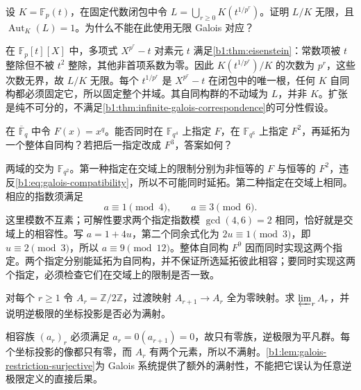 \begin{exercise}\label{b1:ex:22-2}
	设 \(K=\mathbb F_p(t)\)，在固定代数闭包中令 \(L=\bigcup_{r\geq0}K(t^{1/p^r})\)。证明 \(L/K\) 无限，且 \(\operatorname{Aut}_K(L)=1\)。为什么不能在此使用无限 Galois 对应？
\end{exercise}
\begin{solution}
	在 \(\mathbb F_p[t][X]\) 中，多项式 \(X^{p^r}-t\) 对素元 \(t\) 满足\cref{b1:thm:eisenstein}：常数项被 \(t\) 整除但不被 \(t^2\) 整除，其他非首项系数为零。因此 \(K(t^{1/p^r})/K\) 的次数为 \(p^r\)，这些次数无界，故 \(L/K\) 无限。每个 \(t^{1/p^r}\) 是 \(X^{p^r}-t\) 在闭包中的唯一根，任何 \(K\) 自同构都必须固定它，所以固定整个并域。其自同构群的不动域为 \(L\)，并非 \(K\)。扩张是纯不可分的，不满足\cref{b1:thm:infinite-galois-correspondence}的可分性假设。
\end{solution}

\begin{exercise}\label{b1:ex:22-3}
	在 \(\overline{\mathbb F}_q\) 中令 \(F(x)=x^q\)。能否同时在 \(\mathbb F_{q^4}\) 上指定 \(F\)，在 \(\mathbb F_{q^6}\) 上指定 \(F^2\)，再延拓为一个整体自同构？若把后一指定改成 \(F^3\)，答案如何？
\end{exercise}
\begin{solution}
	两域的交为 \(\mathbb F_{q^2}\)。第一种指定在交域上的限制分别为非恒等的 \(F\) 与恒等的 \(F^2\)，违反\eqref{b1:eq:galois-compatibility}，所以不可能同时延拓。第二种指定在交域上相同。相应的指数须满足
	\[
		a\equiv1\pmod4,\qquad a\equiv3\pmod6.
	\]
	这里模数不互素；可解性要求两个指定指数模 \(\gcd(4,6)=2\) 相同，恰好就是交域上的相容性。写 \(a=1+4u\)，第二个同余式化为 \(2u\equiv1\pmod3\)，即 \(u\equiv2\pmod3\)，所以 \(a\equiv9\pmod{12}\)。整体自同构 \(F^9\) 因而同时实现这两个指定。两个指定分别能延拓为自同构，并不保证所选延拓彼此相容；要同时实现这两个指定，必须检查它们在交域上的限制是否一致。
\end{solution}

\begin{exercise}\label{b1:ex:22-4}
	对每个 \(r\geq1\) 令 \(A_r=\mathbb Z/2\mathbb Z\)，过渡映射 \(A_{r+1}\rightarrow A_r\) 全为零映射。求 \(\varprojlim_r A_r\)，并说明逆极限的坐标投影是否必为满射。
\end{exercise}
\begin{solution}
	相容族 \((a_r)_r\) 必须满足 \(a_r=0(a_{r+1})=0\)，故只有零族，逆极限为平凡群。每个坐标投影的像都只有零，而 \(A_r\) 有两个元素，所以不满射。\cref{b1:lem:galois-restriction-surjective}为 Galois 系统提供了额外的满射性，不能把它误认为任意逆极限定义的直接后果。
\end{solution}

